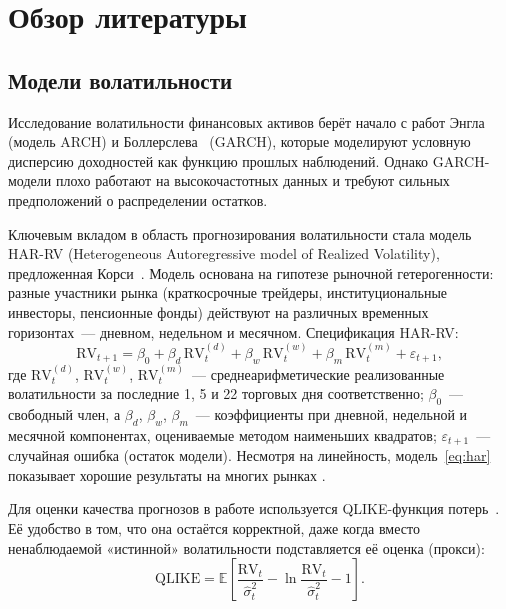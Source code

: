 \section{Обзор литературы}

\subsection{Модели волатильности}

Исследование волатильности финансовых активов берёт начало с работ Энгла~\cite{Engle1982}
(модель ARCH) и Боллерслева~\cite{Bollerslev1986} (GARCH),
которые моделируют условную дисперсию доходностей как функцию прошлых наблюдений.
Однако GARCH-модели плохо работают на высокочастотных данных
и требуют сильных предположений о распределении остатков.

Ключевым вкладом в область прогнозирования волатильности стала модель HAR-RV
(Heterogeneous Autoregressive model of Realized Volatility), предложенная
Корси~\cite{Corsi2009}.
Модель основана на гипотезе рыночной гетерогенности: разные участники рынка
(краткосрочные трейдеры, институциональные инвесторы, пенсионные фонды) действуют
на различных временных горизонтах~--- дневном, недельном и месячном.
Спецификация HAR-RV:
\begin{equation}\label{eq:har}
    \mathrm{RV}_{t+1} = \beta_0 + \beta_d \, \mathrm{RV}_t^{(d)}
    + \beta_w \, \mathrm{RV}_t^{(w)}
    + \beta_m \, \mathrm{RV}_t^{(m)} + \varepsilon_{t+1},
\end{equation}
где $\mathrm{RV}_t^{(d)}$, $\mathrm{RV}_t^{(w)}$, $\mathrm{RV}_t^{(m)}$~---
среднеарифметические реализованные волатильности за последние 1, 5 и 22 торговых дня
соответственно; $\beta_0$~--- свободный член, а $\beta_d$, $\beta_w$, $\beta_m$~---
коэффициенты при дневной, недельной и месячной компонентах, оцениваемые методом
наименьших квадратов; $\varepsilon_{t+1}$~--- случайная ошибка (остаток модели).
Несмотря на линейность, модель~\eqref{eq:har} показывает хорошие
результаты на многих рынках \cite{Corsi2009}.

Для оценки качества прогнозов в работе используется QLIKE-функция
потерь~\cite{Patton2011}. Её удобство в том, что она остаётся корректной,
даже когда вместо ненаблюдаемой «истинной» волатильности подставляется
её оценка (прокси):
\begin{equation}\label{eq:qlike}
    \mathrm{QLIKE} = \mathbb{E}\!\left[
        \frac{\mathrm{RV}_t}{\hat{\sigma}_t^2}
        - \ln\!\frac{\mathrm{RV}_t}{\hat{\sigma}_t^2} - 1
    \right].
\end{equation}

